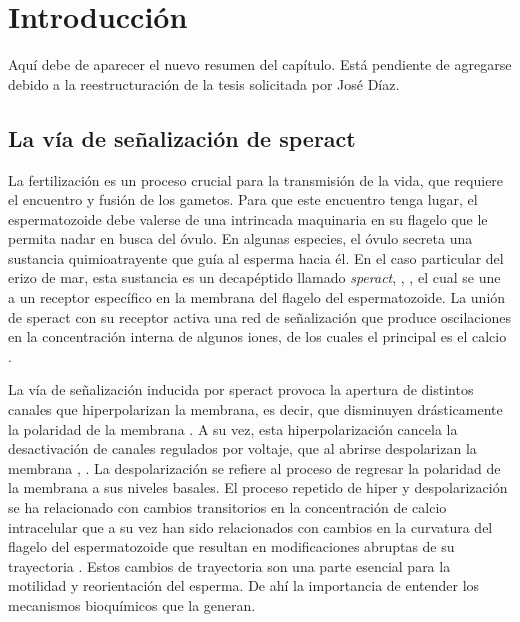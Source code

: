 \chapter{Introducci\'on}\label{ch:antecedentes}

Aquí debe de aparecer el nuevo resumen del capítulo. Está pendiente de agregarse debido a la reestructuración de la tesis solicitada por José Díaz.

\section{La v\'ia de se\~nalizaci\'on de speract}

La fertilización es un proceso crucial para la transmisión de la vida, que requiere el encuentro y fusión de los gametos. Para que este encuentro tenga lugar, el espermatozoide debe valerse de una intrincada maquinaria en su flagelo que le permita nadar en busca del óvulo. En algunas especies, el óvulo secreta una sustancia quimioatrayente que guía al esperma hacia él. En el caso particular del erizo de mar, esta sustancia es un decapéptido llamado \emph{speract}, \citeauthor{SUZUKI:1995gp} \citep{SUZUKI:1995gp}, \citeauthor{Hansbrough:1981vk} \citep{Hansbrough:1981vk}, el cual se une a un receptor específico en la membrana del flagelo del espermatozoide. La unión de speract con su receptor activa una red de señalización que produce oscilaciones en la concentración interna de algunos iones, de los cuales el principal es el calcio \citeauthor{Darszon2008} \citep{Darszon2008}. 

La vía de señalización inducida por speract provoca la apertura de distintos canales que hiperpolarizan la membrana, es decir, que disminuyen drásticamente la polaridad de la membrana \citeauthor{Kaupp:2008gv} \citep{Kaupp:2008gv}. A su vez, esta hiperpolarización cancela la desactivación de canales regulados por voltaje, que al abrirse despolarizan la membrana \citeauthor{Strunker:2006tk} \citep{Strunker:2006tk}, \citeauthor{GranadosGonzalez:2005ia} \citep{GranadosGonzalez:2005ia}. La despolarización se refiere al proceso de regresar la polaridad de la membrana a sus niveles basales. El proceso repetido de hiper y despolarización se ha relacionado con cambios transitorios en la concentración de calcio intracelular que a su vez han sido relacionados con cambios en la curvatura del flagelo del espermatozoide que resultan en modificaciones abruptas de su trayectoria \citeauthor{Darszon2008} \citep{Darszon2008}. Estos cambios de trayectoria son una parte esencial para la motilidad y reorientación del esperma. De ahí la importancia de entender los mecanismos bioquímicos que la generan. 

